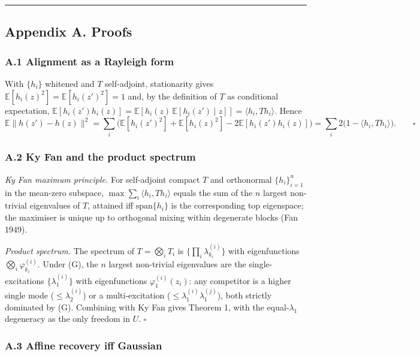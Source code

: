 \documentclass[
  letterpaper,
  11pt]{article}
\theoremstyle{plain}
\theoremstyle{definition}
\theoremstyle{remark}
\begin{document}
\begin{center}\rule{0.5\linewidth}{0.5pt}\end{center}

\subsection{Appendix A. Proofs}\label{sec:appA}

\subsubsection{A.1 Alignment as a Rayleigh form}\label{sec:A1}

With \(\{h_i\}\) whitened and \(T\) self-adjoint, stationarity gives \(\mathbb E[h_i(z)^2]=\mathbb E[h_i(z')^2]=1\) and, by the definition of \(T\) as conditional expectation, \(\mathbb E[h_i(z')h_i(z)] = \mathbb E[h_i(z)\,\mathbb E[h_i(z')\mid z]] = \langle h_i, Th_i\rangle\). Hence
\[\mathbb E\|h(z')-h(z)\|^2 = \sum_i\big(\mathbb E[h_i(z')^2]+\mathbb E[h_i(z)^2]-2\mathbb E[h_i(z')h_i(z)]\big) = \sum_i 2\big(1-\langle h_i,Th_i\rangle\big).\qquad\square\]

\subsubsection{A.2 Ky Fan and the product spectrum}\label{sec:A2}

\emph{Ky Fan maximum principle.} For self-adjoint compact \(T\) and orthonormal \(\{h_i\}_{i=1}^n\) in the mean-zero subspace, \(\max\sum_i\langle h_i,Th_i\rangle\) equals the sum of the \(n\) largest non-trivial eigenvalues of \(T\), attained iff \(\mathrm{span}\{h_i\}\) is the corresponding top eigenspace; the maximiser is unique up to orthogonal mixing within degenerate blocks (Fan 1949).

\emph{Product spectrum.} The spectrum of \(T=\bigotimes_iT_i\) is \(\{\prod_i\lambda_{k_i}^{(i)}\}\) with eigenfunctions \(\bigotimes_i\varphi_{k_i}^{(i)}\). Under (G), the \(n\) largest non-trivial eigenvalues are the single-excitations \(\{\lambda_1^{(i)}\}\) with eigenfunctions \(\varphi_1^{(i)}(z_i)\): any competitor is a higher single mode (\(\le\lambda_2^{(i)}\)) or a multi-excitation (\(\le\lambda_1^{(i)}\lambda_1^{(j)}\)), both strictly dominated by (G). Combining with Ky Fan gives Theorem 1, with the equal-\(\lambda_1\) degeneracy as the only freedom in \(U\). \(\square\)

\subsubsection{A.3 Affine recovery iff Gaussian}\label{sec:A3}
\end{document}
